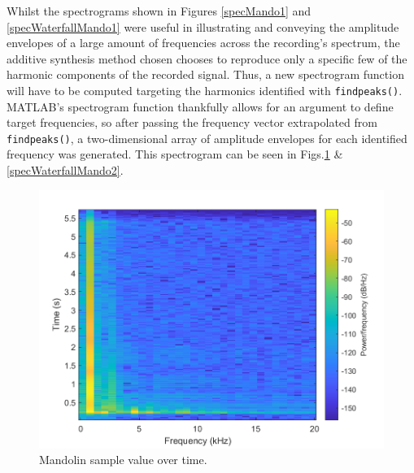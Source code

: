 \documentclass{article}
\begin{document}
            Whilst the spectrograms shown in Figures \ref{specMando1} and \ref{specWaterfallMando1} were useful in illustrating and conveying the amplitude envelopes of a large amount of frequencies across the recording's spectrum, the additive synthesis method chosen chooses to reproduce only a specific few of the harmonic components of the recorded signal.
            Thus, a new spectrogram function will have to be computed targeting the harmonics identified with \texttt{findpeaks()}.
            MATLAB's spectrogram function thankfully allows for an argument to define target frequencies, so after passing the frequency vector extrapolated from \texttt{findpeaks()}, a two-dimensional array of amplitude envelopes for each identified frequency was generated.
            This spectrogram can be seen in Figs.\ref{specMando2} \& \ref{specWaterfallMando2}.
            \begin{figure}[H]
                \includegraphics[scale=0.5]{images/specMando2.png}%
                \centering
                \caption{Mandolin sample value over time.}
                \label{specMando2}
            \end{figure}
\end{document}
